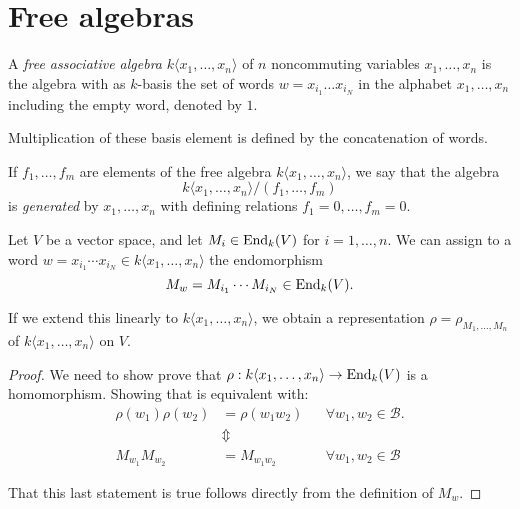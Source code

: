\section{Free algebras}
\begin{defn}
A \emph{free associative algebra} \(k\langle x_{1},\ldots ,x_{n}\rangle \) of \(n\) noncommuting variables \(x_{1},\ldots ,x_{n}\) is the algebra with as \(k\)-basis the set of words \(w=x_{i_{1}}\ldots x_{i_N}\) in the alphabet \(x_{1},\ldots ,x_{n}\) including the empty word, denoted by \(1\).

Multiplication of these basis element is defined by the concatenation of words.
\end{defn}

\begin{defn}

If \(f_{1},\ldots ,f_{m}\) are elements of the free algebra \(k\langle x_{1},\ldots ,x_{n}\rangle \), we say that the algebra
\[k\langle x_{1},\ldots ,x_{n}\rangle /(f_{1},\ldots ,f_{m})\]
is \emph{generated} by \(x_{1},\ldots ,x_{n}\) with defining relations \(f_{1}=0,\ldots ,f_{m}=0\).
\end{defn}

\begin{thm}
Let \(V\) be a vector space, and let \(M_{i}\in \operatorname{End}_{k}(V)\) for \(i=1,\ldots ,n\). We can assign to a word \(w=x_{i_{1}}\cdots x_{i_N}\in k\langle x_{1},\ldots ,x_{n}\rangle \) the endomorphism
\[M_{w}=M_{i_{1}}\cdots M_{i_N}\in \operatorname{End}_{k}(V).\]

If we extend this linearly to \(k\langle x_{1},\ldots ,x_{n}\rangle \), we obtain a representation \(\rho =\rho _{M_{1},\ldots ,M_{n}}\) of \(k\langle x_{1},\ldots ,x_{n}\rangle \) on \(V\).
\end{thm}

\begin{proof}
We need to show prove that \(\rho :k\langle x_{1},\ldots ,x_{n}\rangle \rightarrow \operatorname{End}_{k}(V)\) is a homomorphism. Showing that is equivalent with:
\begin{align*}\rho (w_{1})\rho (w_{2})&=\rho (w_{1}w_{2}) && \forall w_{1},w_{2}\in \mathcal{B}. \\
&\Updownarrow  \\
M_{w_{1}}M_{w_{2}}&=M_{w_{1}w_{2}} && \forall w_{1},w_{2}\in \mathcal{B}
\end{align*}

That this last statement is true follows directly from the definition of \(M_{w}\).
\end{proof}

